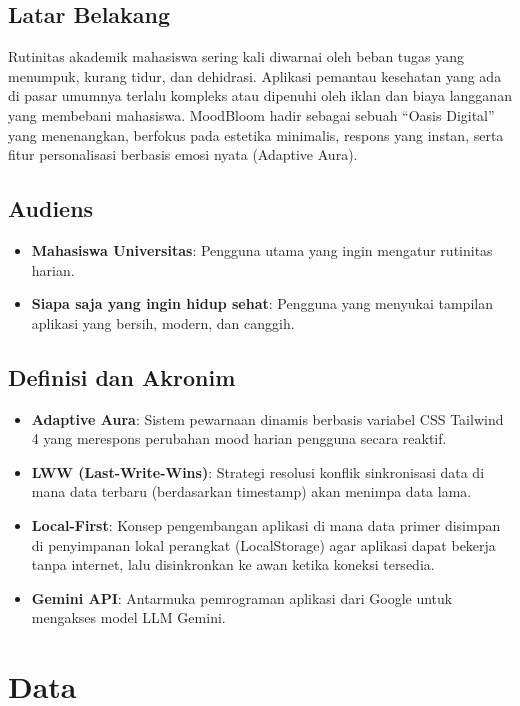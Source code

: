 \documentclass[12pt,a4paper]{article}
\begin{document}
\subsection{Latar Belakang}
Rutinitas akademik mahasiswa sering kali diwarnai oleh beban tugas yang menumpuk, kurang tidur, dan dehidrasi. Aplikasi pemantau kesehatan yang ada di pasar umumnya terlalu kompleks atau dipenuhi oleh iklan dan biaya langganan yang membebani mahasiswa. MoodBloom hadir sebagai sebuah ``Oasis Digital'' yang menenangkan, berfokus pada estetika minimalis, respons yang instan, serta fitur personalisasi berbasis emosi nyata (Adaptive Aura).

\subsection{Audiens}
\begin{itemize}
    \item \textbf{Mahasiswa Universitas}: Pengguna utama yang ingin mengatur rutinitas harian.
    \item \textbf{Siapa saja yang ingin hidup sehat}: Pengguna yang menyukai tampilan aplikasi yang bersih, modern, dan canggih.
\end{itemize}

\subsection{Definisi dan Akronim}
\begin{itemize}
    \item \textbf{Adaptive Aura}: Sistem pewarnaan dinamis berbasis variabel CSS Tailwind 4 yang merespons perubahan mood harian pengguna secara reaktif.
    \item \textbf{LWW (Last-Write-Wins)}: Strategi resolusi konflik sinkronisasi data di mana data terbaru (berdasarkan timestamp) akan menimpa data lama.
    \item \textbf{Local-First}: Konsep pengembangan aplikasi di mana data primer disimpan di penyimpanan lokal perangkat (LocalStorage) agar aplikasi dapat bekerja tanpa internet, lalu disinkronkan ke awan ketika koneksi tersedia.
    \item \textbf{Gemini API}: Antarmuka pemrograman aplikasi dari Google untuk mengakses model LLM Gemini.
\end{itemize}

\section{Data}
\end{document}
